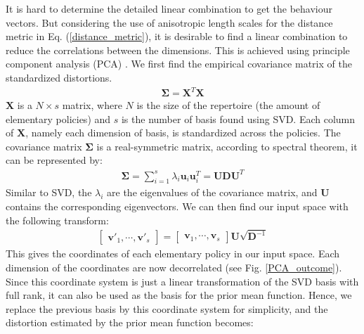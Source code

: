 It is hard to determine the detailed linear combination to get the behaviour vectors.
But considering the use of anisotropic length scales for the distance metric in Eq. (\ref{distance_metric}), it is desirable to find a linear combination to reduce the correlations between the dimensions.
This is achieved using principle component analysis (PCA) \cite{PCA}. We first find the empirical covariance matrix of the standardized distortions.
\begin{equation}
\begin{gathered}
\bm{\Sigma} = \bm{X}^T \bm{X}
\end{gathered}
\label{cov}
\end{equation}
$\bm{X}$ is a $N \times s$ matrix, where $N$ is the size of the repertoire (the amount of elementary policies) and $s$ is the number of basis found using SVD.
Each column of $\bm{X}$, namely each dimension of basis, is standardized across the policies.
The covariance matrix $\bm{\Sigma}$ is a real-symmetric matrix, according to spectral theorem, it can be represented by:
\begin{equation}
\begin{gathered}
\bm{\Sigma} = 
\sum_{i=1}^s \lambda_i \bm{u}_i \bm{u}_i^T = \bm{U} \bm{D} \bm{U}^T
\end{gathered}
\label{PCA}
\end{equation}
Similar to SVD, the $\lambda_i$ are the eigenvalues of the covariance matrix, and $\bm{U}$ contains the corresponding eigenvectors.
We can then find our input space with the following transform:
\begin{equation}
\begin{gathered}
\begin{bmatrix}
\bm{v}'_1, \cdots, \bm{v}'_s
\end{bmatrix}
=
\begin{bmatrix}
\bm{v}_1, \cdots, \bm{v}_s
\end{bmatrix}
\bm{U} \sqrt{\bm{D}^{-1}}
\end{gathered}
\label{input_space}
\end{equation}
This gives the coordinates of each elementary policy in our input space. Each dimension of the coordinates are now decorrelated (see Fig. \ref{PCA_outcome}).
Since this coordinate system is just a linear transformation of the SVD basis with full rank, it can also be used as the basis for the prior mean function.
Hence, we replace the previous basis by this coordinate system for simplicity, and the distortion estimated by the prior mean function becomes: 
